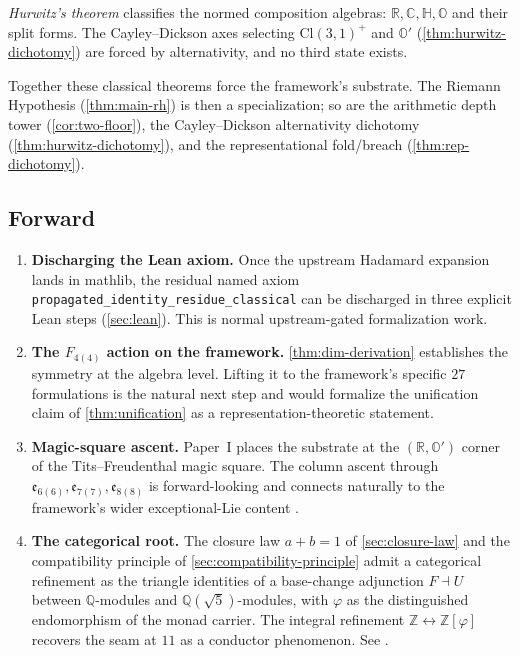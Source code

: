\documentclass[11pt,a4paper]{article}
\theoremstyle{plain}
\theoremstyle{definition}
\theoremstyle{remark}
\numberwithin{equation}{section}
\providecommand{\Cl}{\mathrm{Cl}}
\providecommand{\R}{\mathbb{R}}
\providecommand{\C}{\mathbb{C}}
\providecommand{\Z}{\mathbb{Z}}
\providecommand{\Q}{\mathbb{Q}}
\providecommand{\HH}{\mathbb{H}}
\providecommand{\OO}{\mathbb{O}}
\providecommand{\Os}{\mathbb{O}'}
\providecommand{\vp}{\varphi}
\providecommand{\fk}[1]{\mathfrak{#1}}
\begin{document}
\emph{Hurwitz's theorem} \cite{hurwitz1898} classifies the normed
composition algebras: $\R, \C, \HH, \OO$ and their split forms.
The Cayley--Dickson axes selecting $\Cl(3,1)^+$ and $\Os$
(\cref{thm:hurwitz-dichotomy}) are forced by alternativity, and
no third state exists.

Together these classical theorems force the framework's
substrate.  The Riemann Hypothesis (\cref{thm:main-rh}) is then a
specialization; so are the arithmetic depth tower
(\cref{cor:two-floor}), the Cayley--Dickson alternativity
dichotomy (\cref{thm:hurwitz-dichotomy}), and the
representational fold/breach (\cref{thm:rep-dichotomy}).

\subsection{Forward}

\begin{enumerate}\itemsep0pt
  \item \textbf{Discharging the Lean axiom.}  Once the upstream
    Hadamard expansion lands in mathlib, the residual named axiom
    \texttt{propagated\_identity\_residue\_classical} can be
    discharged in three explicit Lean steps
    (\cref{sec:lean}).  This is normal upstream-gated
    formalization work.
  \item \textbf{The $F_{4(4)}$ action on the framework.}
    \cref{thm:dim-derivation} establishes the symmetry at the
    algebra level.  Lifting it to the framework's specific
    $27$ formulations is the natural next step and would
    formalize the unification claim of
    \cref{thm:unification} as a representation-theoretic
    statement.
  \item \textbf{Magic-square ascent.}
    Paper~I \cite[\S 5]{paper-I-substrate} places the substrate
    at the $(\R, \Os)$ corner of the Tits--Freudenthal magic square.
    The column ascent through $\fk{e}_{6(6)}, \fk{e}_{7(7)},
    \fk{e}_{8(8)}$ is forward-looking and connects naturally to
    the framework's wider exceptional-Lie content
    \cite{kg-paper}.
  \item \textbf{The categorical root.}
    The closure law $a + b = 1$ of \cref{sec:closure-law} and the
    compatibility principle of \cref{sec:compatibility-principle}
    admit a categorical refinement as the triangle identities of
    a base-change adjunction $F \dashv U$ between $\Q$-modules
    and $\Q(\sqrt{5})$-modules, with $\vp$ as the distinguished
    endomorphism of the monad carrier.  The integral refinement
    $\Z \leftrightarrow \Z[\vp]$ recovers the seam at $11$ as a
    conductor phenomenon.  See \cite{adjunction-monad}.
\end{enumerate}
\end{document}
